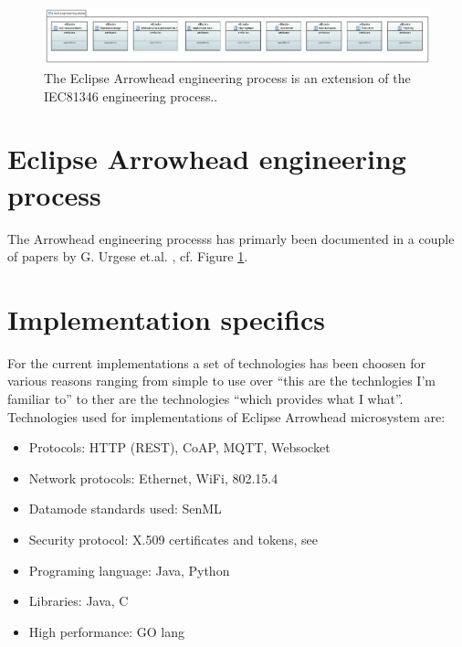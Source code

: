 \documentclass[a4paper]{arrowhead}
\begin{document}
\begin{figure}[ht!]
   \centering
   \includegraphics[width=0.9\linewidth]{figures/ArrowheadEngineeringProcess}
   \caption{The Eclipse Arrowhead engineering process is an extension
     of the IEC81346 engineering process..}
   \label{fig:engineering_process}
 \end{figure}


\section{Eclipse Arrowhead engineering process}
The Arrowhead engineering processs has primarly been documented in a
couple of papers by G. Urgese
et.al. \cite{Urgese2020,Urgese2022}, cf. Figure \ref{fig:engineering_process}. 

\section{Implementation specifics}
For the current implementations a set of technologies has been choosen
for various reasons ranging from simple to use over ``this are the
technlogies I'm familiar to'' to ther are the technologies ``which
provides what I what''. Technologies used for implementations of
Eclipse Arrowhead microsystem are:

\begin{itemize}      
    \item Protocols: HTTP (REST), CoAP, MQTT, Websocket
    \item Network protocols: Ethernet, WiFi, 802.15.4
    \item Datamode standards used: SenML
    \item Security protocol: X.509 certificates and tokens, see \cite{Palm2022}
    \item Programing language: Java, Python
    \item Libraries: Java, C
    \item High performance: GO lang
\end{itemize}  
 









\newpage
\end{document}
